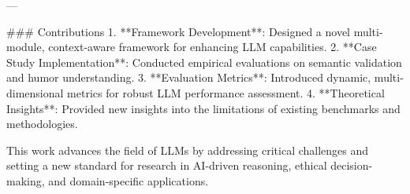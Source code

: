 ---

### Contributions  
1. **Framework Development**: Designed a novel multi-module, context-aware framework for enhancing LLM capabilities.  
2. **Case Study Implementation**: Conducted empirical evaluations on semantic validation and humor understanding.  
3. **Evaluation Metrics**: Introduced dynamic, multi-dimensional metrics for robust LLM performance assessment.  
4. **Theoretical Insights**: Provided new insights into the limitations of existing benchmarks and methodologies.  

This work advances the field of LLMs by addressing critical challenges and setting a new standard for research in AI-driven reasoning, ethical decision-making, and domain-specific applications.  
